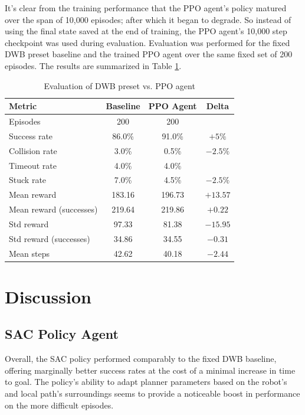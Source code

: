 \documentclass[conference]{IEEEtran}
\begin{document}
    It's clear from the training performance that the PPO agent's policy matured over the span of 10,000 episodes; after which it began to degrade. So instead of using the final state saved at the end of training, the PPO agent's 10,000 step checkpoint was used during evaluation. Evaluation was performed for the fixed DWB preset baseline and the trained PPO agent over the same fixed set of 200 episodes. The results are summarized in Table \ref{tab:ppo_summary}.
    
    \begin{table}[H]
        \centering
        \caption{Evaluation of DWB preset vs. PPO agent}\label{tab:ppo_summary}
        \begin{tabular}{lccc}
            \hline
            \textbf{Metric} & \textbf{Baseline} & \textbf{PPO Agent} & \textbf{Delta} \\
            \hline
            Episodes                & 200       & 200       &               \\
            Success rate            & 86.0\%    & 91.0\%    & $+5\%$        \\
            Collision rate          & 3.0\%     & 0.5\%     & $-2.5\%$      \\
            Timeout rate            & 4.0\%     & 4.0\%     &               \\
            Stuck rate              & 7.0\%     & 4.5\%     & $-2.5\%$      \\
            Mean reward             & 183.16    & 196.73    & $+13.57$      \\
            Mean reward (successes) & 219.64    & 219.86    & $+0.22$       \\
            Std reward              & 97.33     & 81.38     & $-15.95$      \\
            Std reward (successes)  & 34.86     & 34.55     & $-0.31$       \\
            Mean steps              & 42.62     & 40.18     & $-2.44$       \\
            \hline
        \end{tabular}
    \end{table}

\section{Discussion}
    \subsection{SAC Policy Agent}
    Overall, the SAC policy performed comparably to the fixed DWB baseline, offering marginally better success rates at the cost of a minimal increase in time to goal. The policy's ability to adapt planner parameters based on the robot's and local path's surroundings seems to provide a noticeable boost in performance on the more difficult episodes.
\end{document}
